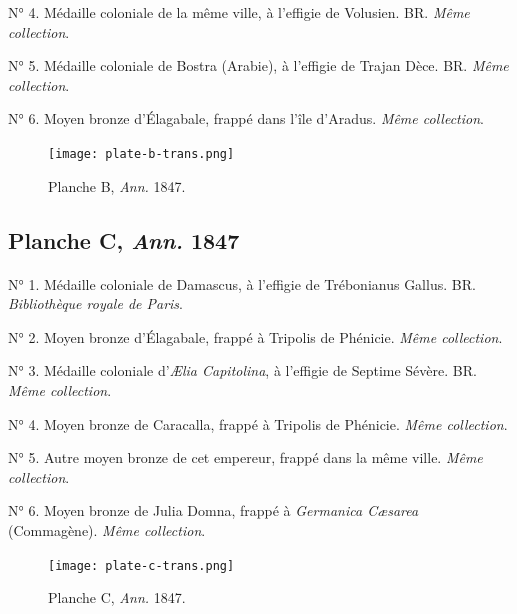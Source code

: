 \documentclass[a4paper, 11pt, oneside, polutonikogreek, french]{article}
\begin{document}
N° 4. Médaille coloniale de la même ville, à l'effigie de Volusien. BR. \emph{Même collection}.

N° 5. Médaille coloniale de Bostra (Arabie), à l'effigie de Trajan Dèce. BR. \emph{Même collection}.

N° 6. Moyen bronze d'Élagabale, frappé dans l'île d'Aradus. \emph{Même collection}.
\vspace*{\fill}
\clearpage
\pagestyle{fancy}
\fancyhf{}
\cfoot{{\scriptsize\bfseries\thepage}}
\vspace*{\fill}
\begin{figure}[H]
\centering
\texttt{[image: plate-b-trans.png]}
\caption{\scriptsize Planche B, \emph{Ann.} 1847.}
\end{figure}
\vspace*{\fill}
\clearpage
\pagestyle{plain}
\cfoot{{\scriptsize\bfseries\thepage}}
\vspace*{\fill}
\subsection{Planche C, \emph{Ann.} 1847}
\paragraph{}
N° 1. Médaille coloniale de Damascus, à l'effigie de Trébonianus Gallus. BR. \emph{Bibliothèque royale de Paris}.

N° 2. Moyen bronze d'Élagabale, frappé à Tripolis de Phénicie. \emph{Même collection}.

N° 3. Médaille coloniale d'\emph{Ælia Capitolina}, à l'effigie de Septime Sévère. BR. \emph{Même collection}.

N° 4. Moyen bronze de Caracalla, frappé à Tripolis de Phénicie. \emph{Même collection}.

N° 5. Autre moyen bronze de cet empereur, frappé dans la même ville. \emph{Même collection}.

N° 6. Moyen bronze de Julia Domna, frappé à \emph{Germanica Cæsarea} (Commagène). \emph{Même collection}.
\vspace*{\fill}
\clearpage
\pagestyle{fancy}
\fancyhf{}
\cfoot{{\scriptsize\bfseries\thepage}}
\vspace*{\fill}
\begin{figure}[H]
\centering
\texttt{[image: plate-c-trans.png]}
\caption{\scriptsize Planche C, \emph{Ann.} 1847.}
\end{figure}
\vspace*{\fill}
\clearpage
\pagestyle{plain}
\cfoot{{\scriptsize\bfseries\thepage}}
\vspace*{\fill}
\end{document}
